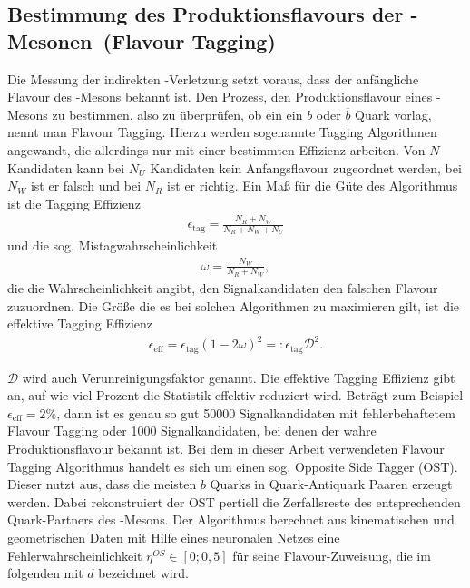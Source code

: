 \subsection[Bestimmung des Produktionsflavours der \Bd-Mesonen (Flavour Tagging)]{Bestimmung des Produktionsflavours der \boldmath\Bd-Mesonen\unboldmath\ (Flavour Tagging)} \label{kap:tagging}
Die Messung der indirekten \CP-Verletzung setzt voraus, dass der anfängliche Flavour des \Bd-Mesons bekannt ist. Den Prozess, den Produktionsflavour eines \Bd-Mesons zu bestimmen, also zu überprüfen, ob ein ein $b$ oder $\overline{b}$ Quark vorlag, nennt man Flavour Tagging. Hierzu werden sogenannte Tagging Algorithmen angewandt, die allerdings nur mit einer bestimmten Effizienz arbeiten. Von $N$ Kandidaten kann bei $N_U$ Kandidaten kein Anfangsflavour zugeordnet werden, bei $N_W$ ist er falsch und bei $N_R$ ist er richtig. Ein Maß für die Güte des Algorithmus ist die Tagging Effizienz
\begin{align}
\epsilon_{\text{tag}} = \frac{N_R+N_W}{N_R+N_W+N_U}
\end{align}
und die sog. Mistagwahrscheinlichkeit
\begin{align}
\omega = \frac{N_W}{N_R+N_W},
\end{align}
die die Wahrscheinlichkeit angibt, den Signalkandidaten den falschen Flavour zuzuordnen. Die Größe die es bei solchen Algorithmen zu maximieren gilt, ist die effektive Tagging Effizienz
\begin{align}
\epsilon_{\text{eff}} = \epsilon_{\text{tag}}(1-2\omega)^2 =: \epsilon_{\text{tag}} \mathcal{D}^2.
\end{align}

$\mathcal{D}$ wird auch Verunreinigungsfaktor genannt. Die effektive Tagging Effizienz gibt an, auf wie viel Prozent die Statistik effektiv reduziert wird. Beträgt zum Beispiel $\epsilon_{\text{eff}} = 2\%$, dann ist es genau so gut 50000 Signalkandidaten mit fehlerbehaftetem Flavour Tagging oder 1000 Signalkandidaten, bei denen der wahre Produktionsflavour bekannt ist. Bei dem in dieser Arbeit verwendeten Flavour Tagging Algorithmus handelt es sich um einen sog. Opposite Side Tagger (OST). Dieser nutzt aus, dass die meisten $b$ Quarks in Quark-Antiquark Paaren erzeugt werden. Dabei rekonstruiert der OST pertiell die Zerfallsreste des entsprechenden Quark-Partners des \Bd-Mesons. Der Algorithmus berechnet aus kinematischen und geometrischen Daten mit Hilfe eines neuronalen Netzes eine Fehlerwahrscheinlichkeit $\eta^{OS} \in [0;0,5]$ für seine Flavour-Zuweisung, die im folgenden mit $d$ bezeichnet wird. \cite{lhcb-paper}

